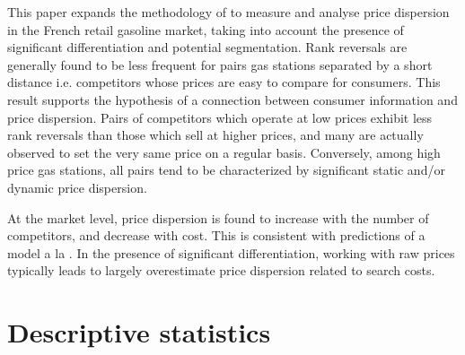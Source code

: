 \documentclass[english]{article}
\begin{document}
This paper expands the methodology of \cite{TAP11} to measure and analyse price dispersion in the French retail gasoline market, taking into account the presence of significant differentiation and potential segmentation. Rank reversals are generally found to be less frequent for pairs gas stations separated by a short distance i.e. competitors whose prices are easy to compare for consumers. This result supports the hypothesis of a connection between consumer information and price dispersion. Pairs of competitors which operate at low prices exhibit less rank reversals than those which sell at higher prices, and many are actually observed to set the very same price on a regular basis. Conversely, among high price gas stations, all pairs tend to be characterized by significant static and/or dynamic price dispersion.

At the market level, price dispersion is found to increase with the number of competitors, and decrease with cost. This is consistent with predictions of a model a la \cite{VAR80}. In the presence of significant differentiation, working with raw prices typically leads to largely overestimate price dispersion related to search costs.


\newpage


\newpage

\appendix

\section{Descriptive statistics}
\end{document}
